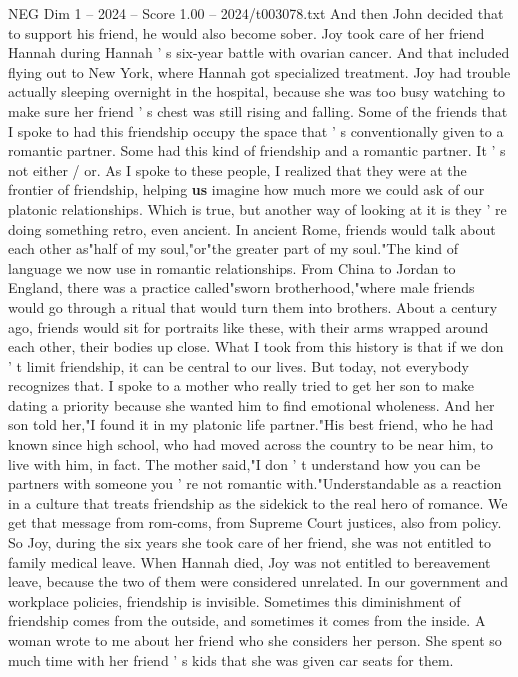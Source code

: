 \begin{textsample}{NEG Dim 1 – 2024 – Score 1.00 – 2024/t003078.txt}
And then John decided that to support his friend, he would also become sober.
Joy took care of her friend Hannah during Hannah ' s six-year battle with ovarian cancer.
And that included flying out to New York, where Hannah got specialized treatment.
Joy had trouble actually sleeping overnight in the hospital, because she was too busy watching to make sure her friend ' s chest was still rising and falling.
Some of the friends that I spoke to had this friendship occupy the space that ' s conventionally given to a romantic partner.
Some had this kind of friendship and a romantic partner.
It ' s not either / or.
As I spoke to these people, I realized that they were at the frontier of friendship, helping \textbf{us} imagine how much more we could ask of our platonic relationships.
Which is true, but another way of looking at it is they ' re doing something retro, even ancient.
In ancient Rome, friends would talk about each other as"half of my soul,"or"the greater part of my soul."The kind of language we now use in romantic relationships.
From China to Jordan to England, there was a practice called"sworn brotherhood,"where male friends would go through a ritual that would turn them into brothers.
About a century ago, friends would sit for portraits like these, with their arms wrapped around each other, their bodies up close.
What I took from this history is that if we don ' t limit friendship, it can be central to our lives.
But today, not everybody recognizes that.
I spoke to a mother who really tried to get her son to make dating a priority because she wanted him to find emotional wholeness.
And her son told her,"I found it in my platonic life partner."His best friend, who he had known since high school, who had moved across the country to be near him, to live with him, in fact.
The mother said,"I don ' t understand how you can be partners with someone you ' re not romantic with."Understandable as a reaction in a culture that treats friendship as the sidekick to the real hero of romance.
We get that message from rom-coms, from Supreme Court justices, also from policy.
So Joy, during the six years she took care of her friend, she was not entitled to family medical leave.
When Hannah died, Joy was not entitled to bereavement leave, because the two of them were considered unrelated.
In our government and workplace policies, friendship is invisible.
Sometimes this diminishment of friendship comes from the outside, and sometimes it comes from the inside.
A woman wrote to me about her friend who she considers her person.
She spent so much time with her friend ' s kids that she was given car seats for them.

\end{textsample}
